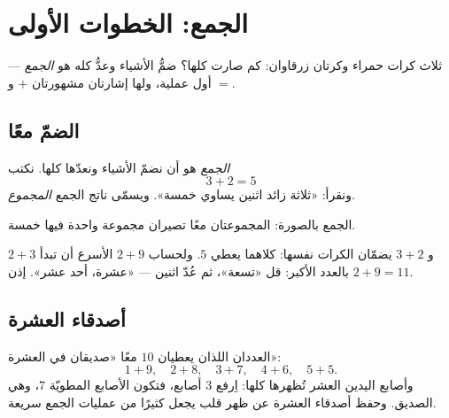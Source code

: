 \chapter{الجمع: الخطوات الأولى}\label{ch:g1:addition}

ثلاث كرات حمراء وكرتان زرقاوان: كم صارت كلها؟ ضمُّ الأشياء وعدُّ
 كله هو \emph{الجمع} --- أول عملية، ولها إشارتان
مشهورتان $+$ و $=$.

\section{الضمّ معًا}

\begin{definition}[الجمع]\label{def:g1:addition:def}
\emph{الجمع} هو أن نضمّ الأشياء ونعدّها كلها. نكتب
\[
3 + 2 = 5
\]
ونقرأ: «ثلاثة زائد اثنين يساوي خمسة». ويسمّى ناتج الجمع
\emph{المجموع}.
\end{definition}

\begin{omfigure}

{\small الجمع بالصورة: المجموعتان معًا تصيران مجموعة
واحدة فيها خمسة.}
\end{omfigure}

\begin{example}\label{ex:g1:addition:order}
$2 + 3$ و $3 + 2$ يضمّان الكرات نفسها: كلاهما يعطي $5$. ولحساب
$2 + 9$ الأسرع أن تبدأ بالعدد الأكبر: قل «تسعة»، ثم عُدّ اثنين ---
«عشرة، أحد عشر». إذن
$2 + 9 = 11$.
\end{example}

\section{أصدقاء العشرة}

\begin{example}\label{ex:g1:addition:friends}
العددان اللذان يعطيان $10$ معًا «صديقان في العشرة»:
\[
1 + 9, \quad 2 + 8, \quad 3 + 7, \quad 4 + 6, \quad 5 + 5 .
\]
وأصابع اليدين العشر تُظهرها كلها: اِرفع $3$ أصابع، فتكون الأصابع
المطويّة $7$، وهي الصديق. وحفظ أصدقاء العشرة عن ظهر قلب يجعل كثيرًا
من عمليات الجمع سريعة.
\end{example}

